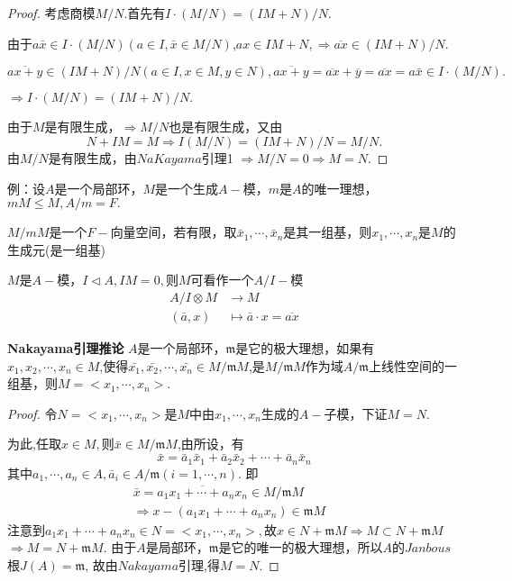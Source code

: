 \documentclass[UTF8]{article}
\begin{document}
\begin{proof}
	考虑商模$M/N$.首先有$I\cdot (M/N)=(IM+N)/N.$
	
	由于$a\bar{x}\in I\cdot(M/N)(a\in I,\bar{x}\in M/N)$,$ax\in IM+N,\Rightarrow \overline{ax}\in (IM+N)/N.$
	
	$\overline{ax+y}\in (IM+N)/N(a\in I,x\in M,y\in N),\overline{ax+y}=\overline{ax}+\overline{y}=\overline{ax}=a\bar{x}\in I\cdot(M/N).$
	
	$\Rightarrow I\cdot (M/N)=(IM+N)/N.$
	
	由于$M$是有限生成，$\Rightarrow M/N$也是有限生成，又由
	$$N+IM=M\Rightarrow I(M/N)=(IM+N)/N=M/N.$$
	由$M/N$是有限生成，由$NaKayama$引理1
	$\Rightarrow M/N=0\Rightarrow M=N.$
\end{proof}
例：设$A$是一个局部环，$M$是一个生成$A-$模，$m$是$A$的唯一理想，$mM\leq M,A/m=F.$

$M/mM$是一个$F-$向量空间，若有限，取$\bar{x}_{1},\cdots,\bar{x}_{n}$是其一组基，则$x_{1},\cdots,x_{n}$是$M$的生成元(是一组基)

$M$是$A-$模，$I\vartriangleleft A,IM=0,$则$M$可看作一个$A/I-$模
\[
\begin{split}
A/I\otimes M&\rightarrow M\\
(\bar{a},x)&\mapsto\bar{a}\cdot x=\overline{ax}
\end{split}
\]




\textbf{Nakayama引理推论}  $A$是一个局部环，$\mathfrak{m}$是它的极大理想，如果有$x_{1},x_{2},\cdots,x_{n}\in M$,使得$\bar{x_{1}},\bar{x_{2}},\cdots,\bar{x_{n}}\in M/\mathfrak{m}M$,是$M/\mathfrak{m}M$作为域$A/\mathfrak{m}$上线性空间的一组基，则$M=<x_{1},\cdots,x_{n}>.$
\begin{proof}
	令$N=<x_{1},\cdots,x_{n}>$是$M$中由$x_{1},\cdots,x_{n}$生成的$A-$子模，下证$M=N$.
	
	为此,任取$x\in M,$则$\bar{x}\in M/\mathfrak{m}M$,由所设，有
	$$
	\bar{x}=\bar{a}_{1}\bar{x}_{1}+\bar{a}_{2}\bar{x}_{2}+\cdots+\bar{a}_{n}\bar{x}_{n}
	$$
	其中$a_{1},\cdots,a_{n}\in A,\bar{a}_{i}\in A/\mathfrak{m}(i=1,\cdots,n).$
	即
	\[
	\begin{split}
	\bar{x}=\overline{a_{1}x_{1}+\cdots+a_{n}x_{n}}\in M/\mathfrak{m}M&\\
	\Rightarrow x-(a_{1}x_{1}+\cdots+a_{n}x_{n})\in \mathfrak{m}M
	\end{split}
	\]
	注意到$a_{1}x_{1}+\cdots+a_{n}x_{n}\in N=<x_{1},\cdots,x_{n}>,$故$x\in N+\mathfrak{m}M\Rightarrow 
	M\subset N+\mathfrak{m}M$ $\Rightarrow M=N+\mathfrak{m}M.$
	由于$A$是局部环，$\mathfrak{m}$是它的唯一的极大理想，所以$A$的$Janbous$根$J(A)=\mathfrak{m}$,
	故由$Nakayama$引理,得$M=N$.
\end{proof}
\end{document}
